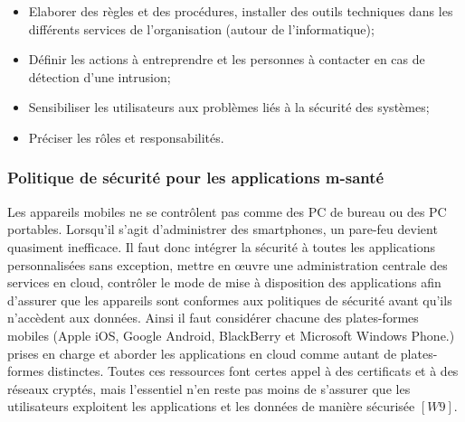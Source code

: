 \vspace{6pt}
\paragraphmark

\begin{itemize}
	\item Elaborer des règles et des procédures, installer des outils techniques dans les différents services de l'organisation (autour de l'informatique);
	\item Définir les actions à entreprendre et les personnes à contacter en cas de détection d'une intrusion;
	\item Sensibiliser les utilisateurs aux problèmes liés à la sécurité des systèmes;
	\item Préciser les rôles et responsabilités.
\end{itemize}

\subsubsection{Politique de sécurité pour les applications m-santé}

Les appareils mobiles ne se contrôlent pas comme des PC de bureau ou des PC portables. Lorsqu'il s'agit d'administrer des smartphones, un pare-feu devient quasiment inefficace. Il faut donc intégrer la sécurité à toutes les applications personnalisées sans exception, mettre en œuvre une administration centrale des services en cloud, contrôler le mode de mise à disposition des applications afin d'assurer que les appareils sont conformes aux politiques de sécurité avant qu'ils n'accèdent aux données. Ainsi il faut considérer chacune des plates-formes mobiles (Apple iOS, Google Android, BlackBerry et Microsoft Windows Phone.) prises en charge et aborder les applications en cloud comme autant de plates-formes distinctes. Toutes ces ressources font certes appel à des certificats et à des réseaux cryptés, mais l'essentiel n’en reste pas moins de s'assurer que les utilisateurs exploitent les applications et les données de manière sécurisée $[W9]$.